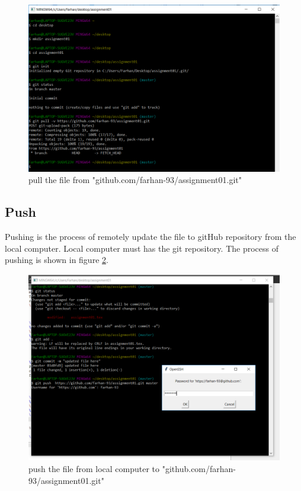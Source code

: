 \documentclass[paper=a4, fontsize=12pt]{scrartcl}
\numberwithin{equation}{section} %
\numberwithin{figure}{section} %
\numberwithin{table}{section} %
\begin{document}
\begin{figure}
\includegraphics[width=\linewidth]{pull.png}
\caption{pull the file from "github.com/farhan-93/assignment01.git"}
\label{cpull}
\end{figure}




\subsection{Push}
Pushing is the process of remotely update the file to gitHub repository from the local computer. Local computer must has the git repository. The process of pushing is shown in figure \ref{cpush}.




\begin{figure}
\includegraphics[width=\linewidth]{push.png}
\caption{push the file from local computer to "github.com/farhan-93/assignment01.git"}
\label{cpush}
\end{figure}


\end{document}
